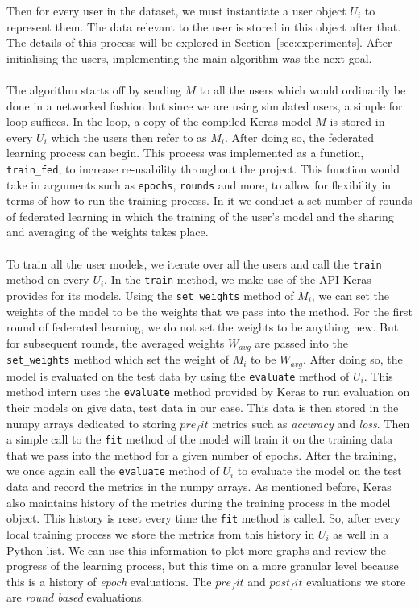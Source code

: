\documentclass[12pt]{article}
\begin{document}
\noindent Then for every user in the dataset, we must instantiate a user object $U_i$ to represent them. The data relevant to the user is stored in this object after that. The details of this process will be explored in Section~\ref{sec:experiments}. After initialising the users, implementing the main algorithm was the next goal. 
\\\\
The algorithm starts off by sending $M$ to all the users which would ordinarily be done in a networked fashion but since we are using simulated users, a simple for loop suffices. In the loop, a copy of the compiled Keras model $M$ is stored in every $U_i$ which the users then refer to as $M_i$. After doing so, the federated learning process can begin. This process was implemented as a function, \texttt{train\_fed}, to increase re-usability throughout the project. This function would take in arguments such as \texttt{epochs}, \texttt{rounds} and more, to allow for flexibility in terms of how to run the training process. In it we conduct a set number of rounds of federated learning in which the training of the user's model and the sharing and averaging of the weights takes place.
\\\\
To train all the user models, we iterate over all the users and call the \texttt{train} method on every $U_i$. In the \texttt{train} method, we make use of the API Keras provides for its models. Using the \texttt{set\_weights} method of $M_i$, we can set the weights of the model to be the weights that we pass into the method. For the first round of federated learning, we do not set the weights to be anything new. But for subsequent rounds, the averaged weights $W_{avg}$ are passed into the \texttt{set\_weights} method which set the weight of $M_i$ to be $W_{avg}$. After doing so, the model is evaluated on the test data by using the \texttt{evaluate} method of $U_i$. This method intern uses the \texttt{evaluate} method provided by Keras to run evaluation on their models on give data, test data in our case. This data is then stored in the numpy arrays dedicated to storing $pre_fit$ metrics such as \textit{accuracy} and \textit{loss}. Then a simple call to the \texttt{fit} method of the model will train it on the training data that we pass into the method for a given number of epochs. After the training, we once again call the \texttt{evaluate} method of $U_i$ to evaluate the model on the test data and record the metrics in the numpy arrays. As mentioned before, Keras also maintains history of the metrics during the training process in the model object. This history is reset every time the \texttt{fit} method is called. So, after every local training process we store the metrics from this history in $U_i$ as well in a Python list. We can use this information to plot more graphs and review the progress of the learning process, but this time on a more granular level because this is a history of \textit{epoch} evaluations. The $pre_fit$ and $post_fit$ evaluations we store are \textit{round based} evaluations.
\end{document}
